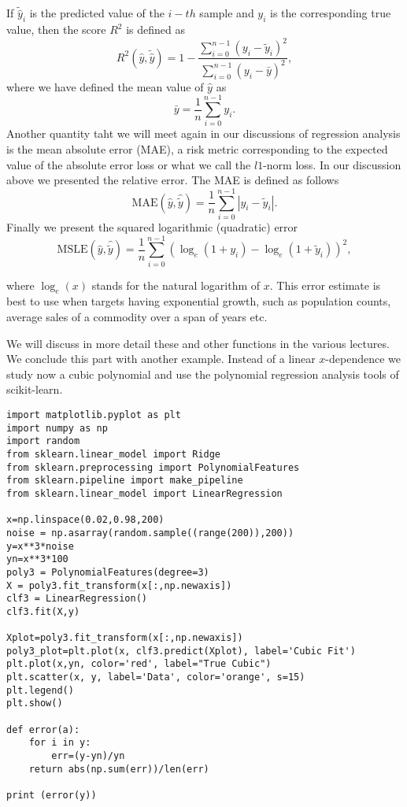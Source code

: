 \documentclass[%
oneside,                 %
final,                   %
10pt]{article}
\begin{document}
If $\tilde{\hat{y}}_i$ is the predicted value of the $i-th$ sample and $y_i$ is the corresponding true value, then the score $R^2$ is defined as
\[
R^2(\hat{y}, \tilde{\hat{y}}) = 1 - \frac{\sum_{i=0}^{n - 1} (y_i - \tilde{y}_i)^2}{\sum_{i=0}^{n - 1} (y_i - \bar{y})^2},
\]
where we have defined the mean value  of $\hat{y}$ as
\[
\bar{y} =  \frac{1}{n} \sum_{i=0}^{n - 1} y_i.
\]
Another quantity taht we will meet again in our discussions of regression analysis is 
 the mean absolute error (MAE), a risk metric corresponding to the expected value of the absolute error loss or what we call the $l1$-norm loss. In our discussion above we presented the relative error.
The MAE is defined as follows
\[
\text{MAE}(\hat{y}, \hat{\tilde{y}}) = \frac{1}{n} \sum_{i=0}^{n-1} \left| y_i - \tilde{y}_i \right|.
\]
Finally we present the 
squared logarithmic (quadratic) error
\[
\text{MSLE}(\hat{y}, \hat{\tilde{y}}) = \frac{1}{n} \sum_{i=0}^{n - 1} (\log_e (1 + y_i) - \log_e (1 + \tilde{y}_i) )^2,
\]

where $\log_e (x)$ stands for the natural logarithm of $x$. This error
estimate is best to use when targets having exponential growth, such
as population counts, average sales of a commodity over a span of
years etc. 

We will discuss in more
detail these and other functions in the various lectures.  We conclude this part with another example. Instead of 
a linear $x$-dependence we study now a cubic polynomial and use the polynomial regression analysis tools of scikit-learn. 

\begin{verbatim}
import matplotlib.pyplot as plt
import numpy as np
import random
from sklearn.linear_model import Ridge
from sklearn.preprocessing import PolynomialFeatures
from sklearn.pipeline import make_pipeline
from sklearn.linear_model import LinearRegression

x=np.linspace(0.02,0.98,200)
noise = np.asarray(random.sample((range(200)),200))
y=x**3*noise
yn=x**3*100
poly3 = PolynomialFeatures(degree=3)
X = poly3.fit_transform(x[:,np.newaxis])
clf3 = LinearRegression()
clf3.fit(X,y)

Xplot=poly3.fit_transform(x[:,np.newaxis])
poly3_plot=plt.plot(x, clf3.predict(Xplot), label='Cubic Fit')
plt.plot(x,yn, color='red', label="True Cubic")
plt.scatter(x, y, label='Data', color='orange', s=15)
plt.legend()
plt.show()

def error(a):
    for i in y:
        err=(y-yn)/yn
    return abs(np.sum(err))/len(err)

print (error(y))
\end{verbatim}
\end{document}
